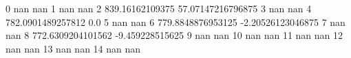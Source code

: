 0 nan nan
1 nan nan
2 839.16162109375 57.07147216796875
3 nan nan
4 782.0901489257812 0.0
5 nan nan
6 779.8848876953125 -2.20526123046875
7 nan nan
8 772.6309204101562 -9.459228515625
9 nan nan
10 nan nan
11 nan nan
12 nan nan
13 nan nan
14 nan nan
